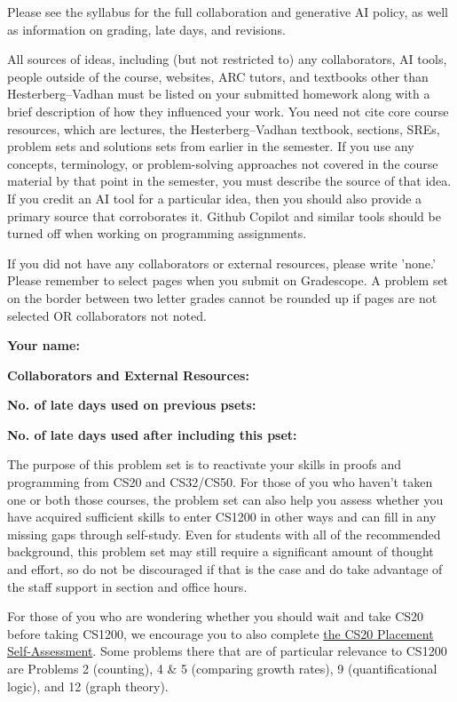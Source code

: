 \documentclass[11pt]{article}
\begin{document}

Please see the syllabus for the full collaboration and generative AI policy, as well as information on grading, late days, and revisions.

All sources of ideas, including (but not restricted to) any collaborators, AI tools, people outside of the course, websites, ARC tutors, and textbooks other than Hesterberg--Vadhan must be listed on your submitted homework along with a brief description of how they influenced your work. You need not cite core course resources, which are lectures, the Hesterberg--Vadhan textbook, sections, SREs, problem sets and solutions sets from earlier in the semester. If you use any concepts, terminology, or problem-solving approaches not covered in the course material by that point in the semester, you must describe the source of that idea. If you credit an AI tool for a particular idea, then you should also provide a primary source that corroborates it. Github Copilot and similar tools should be turned off when working on programming assignments.

If you did not have any collaborators or external resources, please write 'none.' Please remember to select pages when you submit on Gradescope. A problem set on the border between two letter grades cannot be rounded up if pages are not selected OR collaborators not noted.
\newline

\textbf{Your name: }

\textbf{Collaborators and External Resources:}

\textbf{No. of late days used on previous psets: }

\textbf{No. of late days used after including this pset: }

\vspace{1em}

The purpose of this problem set is to reactivate your skills in proofs and programming from CS20 and CS32/CS50. For those of you who haven't taken one or both those courses, the problem set can also help you assess whether you have acquired sufficient skills to enter CS1200 in other ways and can fill in any missing gaps through self-study. Even for students with all of the recommended background, this problem set may still require a significant amount of thought and effort, so do not be discouraged if that is the case and do take advantage of the staff support in section and office hours. 

For those of you who are wondering whether you should wait and take CS20 before taking CS1200, we encourage you to also complete  \href{https://drive.google.com/file/d/1QIJR6sb9hfkK67PhpQaK9KQBzYwzXvsW/view}{the CS20 Placement Self-Assessment}.  Some problems there that are of particular relevance to CS1200 are Problems 2 (counting), 4 \& 5 (comparing growth rates), 9 (quantificational logic), and 12 (graph theory). 
\end{document}
